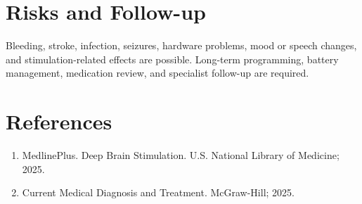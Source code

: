 \section*{Risks and Follow-up}
Bleeding, stroke, infection, seizures, hardware problems, mood or speech changes, and stimulation-related effects are possible. Long-term programming, battery management, medication review, and specialist follow-up are required.

\section*{References}
\begin{enumerate}
  \item MedlinePlus. Deep Brain Stimulation. U.S. National Library of Medicine; 2025.
  \item Current Medical Diagnosis and Treatment. McGraw-Hill; 2025.
\end{enumerate}
\clearpage
